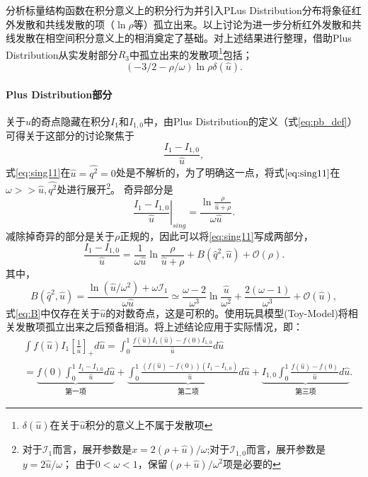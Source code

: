 分析标量结构函数在积分意义上的积分行为并引入PLus Distribution分布将象征红外发散和共线发散的项（$\ln\rho$等）孤立出来。以上讨论为进一步分析红外发散和共线发散在相空间积分意义上的相消奠定了基础。对上述结果进行整理，借助Plus Distribution从实发射部分$R_{3}$中孤立出来的发散项\footnote{$\delta(\hat{u})$在关于$\hat{u}$积分的意义上不属于发散项}包括；
\begin{equation}
    (-3/2-\rho/\omega)\ln\rho \delta(\hat{u}).
\end{equation}
\paragraph{Plus Distribution部分}
关于$\hat{u}$的奇点隐藏在积分$I_{1}$和$I_{1,0}$中，由Plus Distribution的定义（式\eqref{eq:pb_def}）可得关于这部分的讨论聚焦于
\begin{equation}
    \frac{I_1-I_{1,0}}{\hat{u}},
    \label{eq:sing11}
    \end{equation}
式\eqref{eq:sing11}在$\hat{u}=\hat{q^2}=0$处是不解析的，为了明确这一点，将式$\ref{eq:sing11}$在$\omega>>\hat{u},\hat{q^{2}}$处进行展开\footnote{对于$\mathcal{I}_1$而言，展开参数是$x=2(\rho+\hat{u})/\omega$;对于$\mathcal{I}_{1,0}$而言，展开参数是$y=2\hat{u}/\omega$； 由于$0<\omega<1$，保留$(\rho+\hat{u})/\omega^2$项是必要的}。
奇异部分是
\begin{equation}
    \left.\frac{I_1-I_{1,0}}{\hat{u}}\right|_{sing}=\frac{\ln \frac{\rho}{\hat{u}+\rho}}{\omega \hat{u}} .
    \end{equation}
减除掉奇异的部分是关于$\rho$正规的，因此可以将\ref{eq:sing11}写成两部分，
\begin{equation}
    \frac{I_1-I_{1,0}}{\hat{u}}=\frac{1}{\omega\hat{u}} \ln \frac{\rho}{\hat{u}+\rho}+B\left(\hat{q}^2, \hat{u}\right)+\mathcal{O}(\rho) .
    \end{equation}
其中，
    \begin{equation}
        B(\hat{q}^2, \hat{u})=\frac{\ln(\hat{u} / \omega^2)+\omega\mathcal{I}_1}{\omega \hat{u}} \simeq \frac{\omega-2}{\omega^3} \ln \frac{\hat{u}}{\omega^2}+\frac{2(\omega-1)}{\omega^3}+\mathcal{O} (\hat{u}),
        \label{eq:B}
        \end{equation}
    式\eqref{eq:B}中仅存在关于$\hat{u}$的对数奇点，这是可积的。使用玩具模型(Toy-Model)将相关发散项孤立出来之后预备相消。将上述结论应用于实际情况，即：
    \begin{equation}
        \begin{aligned}
        & \int f(\hat{u}) I_1\left[\frac{1}{\hat{u}}\right]_{+} d \hat{u}=\int_0^1 \frac{f(\hat{u}) I_1(\hat{u})-f(0) I_{1,0}}{\hat{u}} d \hat{u} \\
        & =\underbrace{f(0) \int_0^1 \frac{I_1-I_{1,0}}{\hat{u}} d \hat{u}}_{\text{第一项}}+\underbrace{\int_0^1 \frac{(f(\hat{u})-f(0))\left(I_1-I_{1,0}\right)}{\hat{u}} d \hat{u}}_{\text{第二项}}+\underbrace{I_{1,0} \int_0^1 \frac{f(\hat{u})-f(0)}{\hat{u}} d \hat{u}}_{\text{第三项}}.
        \end{aligned}
        \label{eq:pbexplict}
        \end{equation}

